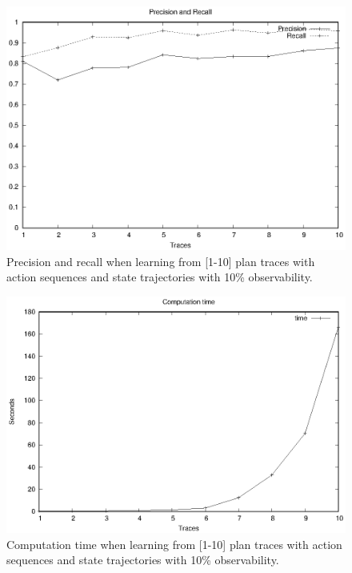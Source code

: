 \begin{figure}[hbt!]
	\centering
	\includegraphics[width=0.65\linewidth]{figures/input_size_100_10_precision.eps}
	\caption{Precision and recall when learning from [1-10] plan traces with \FO action sequences and \PO state trajectories with 10\% observability.}
	\label{fig:np_quality}
\end{figure}

\begin{figure}[hbt!]
	\centering
	\includegraphics[width=0.65\linewidth]{figures/input_size_100_10_time.eps}
	\caption{Computation time when learning from [1-10] plan traces with \FO action sequences and \PO state trajectories with 10\% observability.}
	\label{fig:np_time}
\end{figure}

